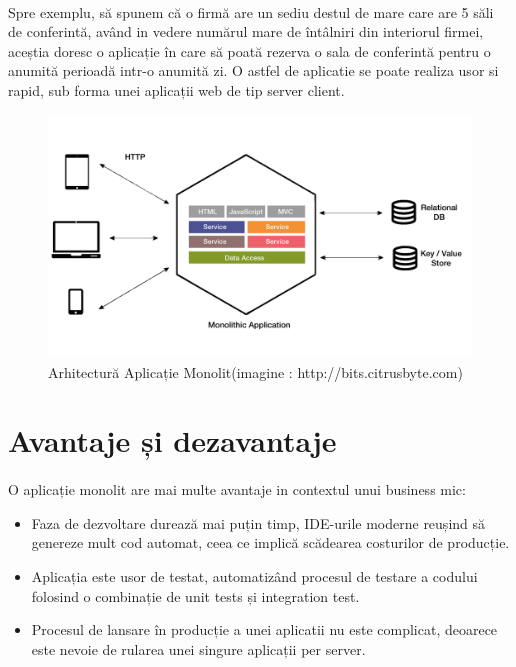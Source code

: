 \documentclass[12pt]{report}
\begin{document}
  	\paragraph{}Spre exemplu, să spunem că o firmă are un sediu destul de mare care are 5 săli de conferintă, având in vedere numărul mare de întâlniri din interiorul firmei, aceștia doresc o aplicație în care să poată rezerva o sala de conferintă pentru o anumită perioadă intr-o anumită zi. O astfel de aplicatie se poate realiza usor si rapid, sub forma unei aplicații web de tip server client.
  	\begin{figure}[h]
  	\centering
  	\includegraphics[scale=.2]{monolitFigure}
	\caption{Arhitectură Aplicație Monolit(imagine : http://bits.citrusbyte.com)}  
  	\end{figure}
  	\section{Avantaje și dezavantaje}
  	\paragraph{}O aplicație monolit are mai multe avantaje in contextul unui business mic:
  	
  	\begin{itemize}
  	\item Faza de dezvoltare durează mai puțin timp, IDE-urile moderne reușind să genereze mult cod automat, ceea ce implică scădearea costurilor de producție.
  	\item Aplicația este usor de testat, automatizând procesul de testare a codului folosind o combinație de unit tests și integration test. 
  	\item Procesul de lansare în producție a unei aplicatii nu este complicat, deoarece este nevoie de rularea unei singure aplicații per server.
  	\end{itemize}
\end{document}
